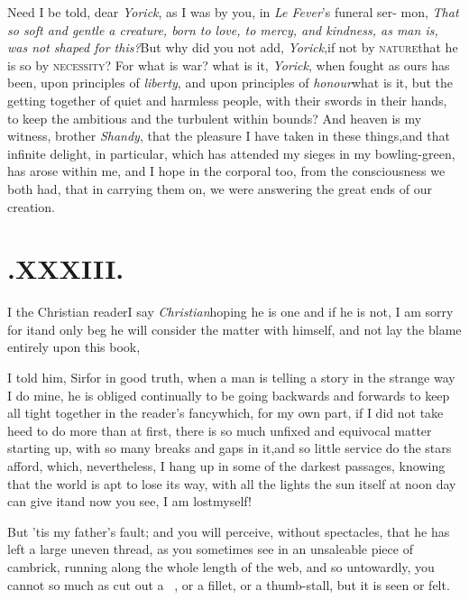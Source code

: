 \documentclass{article}
\begin{document}
Need I be told, dear \textit{Yorick}, as I was by you, in \textit{Le
Fever}’s funeral ser- mon, \textit{That so soft and gentle a
creature, born to love, to mercy, and kindness, as man is, was not
shaped for this?}\tsh But why did you not add,
\textit{Yorick},\tsk if not by \textsc{nature}\tsk that he
is so by \textsc{necessity}?\break
\tsh For what is war?
what is it, \textit{Yorick}, when fought as ours has been, upon
principles of \textit{liberty}, and upon principles of
\textit{honour}\tsk what is it, but the getting together of quiet
and harmless people, with their swords in their hands, to keep the
ambitious and the turbulent within bounds? And heaven is my
witness, brother \textit{Shandy}, that the pleasure I have taken in
these things,\tsk and that infinite delight, in particular, which
has attended my sieges in my bowling-green, has arose within me,
and I hope in the corporal too, from the consciousness we both had,
that in carrying them on, we were answering the great ends of our\break
creation.

\vfill{}\eject
\section{.\enspace XXXIII.}

\lettrine{I}{ } the Christian reader\tsk I
say\break
\textit{Christian}\tsh hoping he is one\tsh\break
and if he is not, I am sorry for it\tsh and only beg he will consider the matter
with himself, and not lay the blame entirely upon this book,\tsh

I told him, Sir\tsh for in good truth, when a man is
telling a story in the strange way I do mine, he is obliged
continually to be going backwards and forwards to keep all tight
together in the reader’s fancy\tsh which, for my own
part, if I did not take heed to do more than at first, there is so
much unfixed and equivocal matter starting up, with so many breaks
and gaps in it,\tsk and so little service do the stars afford,
which, nevertheless, I hang up in some of the darkest passages,
knowing that the world is apt to lose its way, with all the lights
the sun itself at noon day can give it\tsh and now you
see, I am lost\break myself!\tsh

\tsh But ’tis my father’s fault; and\break
{}\break you will perceive, without
spectacles, that he has left a large uneven thread, as you
sometimes see in an unsaleable piece of cambrick, running along the
whole length of the web, and so untowardly, you cannot so much as
cut out a \lower-2pt\hbox{\small\ast\ \ast},\break
{}\break
\tsh or a fillet, or a thumb-stall, but it is seen
or felt.\tsh
\end{document}
